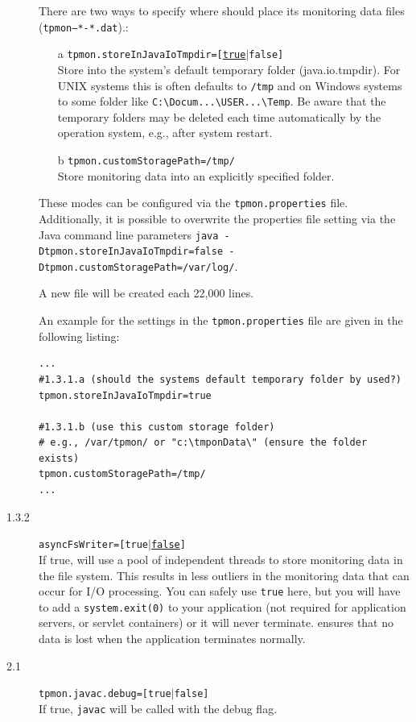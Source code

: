 \documentclass[a4paper,12pt]{scrartcl}
\begin{document}
\begin{description}
There are two ways to specify where \tpmon{} should place its monitoring data files (\texttt{tpmon--*-*.dat}).:
\begin{enumerate}
\item [a] \texttt{tpmon.storeInJavaIoTmpdir=[\underline{true}$|$false]} \\ Store into the system's default temporary folder (java.io.tmpdir). For UNIX systems this is often defaults to \texttt{/tmp} and on Windows systems to some folder like \verb=C:\Docum...\USER...\Temp=. Be aware that the temporary folders may be deleted each time automatically by the operation system, e.g., after system restart.
\item [b] \texttt{tpmon.customStoragePath=/tmp/} \\ Store monitoring data into an explicitly specified folder.
\end{enumerate}
These modes can be configured via the \texttt{tpmon.properties} file. Additionally, it is possible to overwrite the properties file setting via the Java command line parameters \footnotesize \texttt{java -Dtpmon.storeInJavaIoTmpdir=false -Dtpmon.customStoragePath=/var/log/}. \normalsize

A new file will be created each 22,000 lines.

An example for the settings in the \texttt{tpmon.properties} file are given in the following listing:
\begin{lstlisting}[caption={Linux/Unix: Specification of the monitoring data storage location}]
...
#1.3.1.a (should the systems default temporary folder by used?)
tpmon.storeInJavaIoTmpdir=true

#1.3.1.b (use this custom storage folder)
# e.g., /var/tpmon/ or "c:\tmponData\" (ensure the folder exists)
tpmon.customStoragePath=/tmp/
...
\end{lstlisting}

\item [1.3.2] \texttt{asyncFsWriter=[true$|$\underline{false}]} \\
If true, \tpmon{} will use a pool of independent threads to store monitoring data in the file system. This results in less outliers in the monitoring data that can occur for I/O processing. You can safely use \texttt{true} here, but you will have to add a \texttt{system.exit(0)} to your application (not required for application servers, or servlet containers) or it will never terminate. \tpmon{} ensures that no data is lost when the application terminates normally.
\item [2.1] \texttt{tpmon.javac.debug=[true$|$\texttt{false}]} \\
If true, \texttt{javac} will be called with the debug flag.
\end{description}
\end{document}
